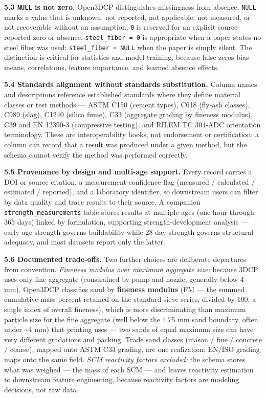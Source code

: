 \documentclass[
  11pt,
  letterpaper,
]{article}
\begin{document}
\textbf{5.3 \texttt{NULL} is not zero.} Open3DCP distinguishes
missingness from absence. \texttt{NULL} marks a value that is unknown,
not reported, not applicable, not measured, or not recoverable without
an assumption; \texttt{0} is reserved for an explicit source-reported
zero or absence. \texttt{steel\_fiber\ =\ 0} is appropriate when a paper
states no steel fiber was used; \texttt{steel\_fiber\ =\ NULL} when the
paper is simply silent. The distinction is critical for statistics and
model training, because false zeros bias means, correlations, feature
importance, and learned absence effects.

\textbf{5.4 Standards alignment without standards substitution.} Column
names and descriptions reference established standards where they define
material classes or test methods --- ASTM C150 (cement types), C618
(fly-ash classes), C989 (slag), C1240 (silica fume), C33 (aggregate
grading by fineness modulus), C39 and EN 12390-3 (compressive testing),
and RILEM TC 304-ADC orientation terminology. These are interoperability
hooks, not endorsement or certification: a column can record that a
result was produced under a given method, but the schema cannot verify
the method was performed correctly.

\textbf{5.5 Provenance by design and multi-age support.} Every record
carries a DOI or source citation, a measurement-confidence flag
(measured / calculated / estimated / reported), and a laboratory
identifier, so downstream users can filter by data quality and trace
results to their source. A companion \texttt{strength\_measurements}
table stores results at multiple ages (one hour through 365 days) linked
by formulation, supporting strength-development analysis --- early-age
strength governs buildability while 28-day strength governs structural
adequacy, and most datasets report only the latter.

\textbf{5.6 Documented trade-offs.} Two further choices are deliberate
departures from convention. \emph{Fineness modulus over maximum
aggregate size:} because 3DCP uses only fine aggregate (constrained by
pump and nozzle, generally below 4 mm), Open3DCP classifies sand by
\textbf{fineness modulus} (FM --- the summed cumulative mass-percent
retained on the standard sieve series, divided by 100; a single index of
overall fineness), which is more discriminating than maximum particle
size for the fine aggregate (well below the 4.75 mm sand boundary, often
under \textasciitilde4 mm) that printing uses --- two sands of equal
maximum size can have very different gradations and packing. Trade sand
classes (mason / fine / concrete / coarse), mapped onto ASTM C33
grading, are one realization; EN/ISO grading maps onto the same field.
\emph{SCM reactivity factors excluded:} the schema stores what was
weighed --- the mass of each SCM --- and leaves reactivity estimation to
downstream feature engineering, because reactivity factors are modeling
decisions, not raw data.
\end{document}
